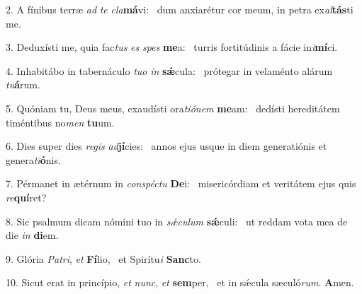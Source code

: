 2. A fínibus terræ \textit{ad} \textit{te} \textit{cla}\textbf{má}vi: \ast\  dum anxiarétur cor meum, in petra ex\textit{al}\textbf{tás}ti me.\

3. Deduxísti me, quia fac\textit{tus} \textit{es} \textit{spes} \textbf{me}a: \ast\  turris fortitúdinis a fácie in\textit{i}\textbf{mí}ci.\

4. Inhabitábo in tabernáculo \textit{tu}\textit{o} \textit{in} \textbf{sǽ}cula: \ast\  prótegar in velaménto alárum \textit{tu}\textbf{á}rum.\

5. Quóniam tu, Deus meus, exaudísti ora\textit{ti}\textit{ó}\textit{nem} \textbf{me}am: \ast\  dedísti hereditátem timéntibus no\textit{men} \textbf{tu}um.\

6. Dies super dies \textit{re}\textit{gis} \textit{ad}\textbf{jí}cies: \ast\  annos ejus usque in diem generatiónis et genera\textit{ti}\textbf{ó}nis.\

7. Pérmanet in ætérnum in \textit{con}\textit{spéc}\textit{tu} \textbf{De}i: \ast\  misericórdiam et veritátem ejus quis \textit{re}\textbf{quí}ret?\

8. Sic psalmum dicam nómini tuo in \textit{sǽ}\textit{cu}\textit{lum} \textbf{sǽ}culi: \ast\  ut reddam vota mea de die \textit{in} \textbf{di}em.\

9. Glória \textit{Pa}\textit{tri}, \textit{et} \textbf{Fí}lio, \ast\  et Spirítu\textit{i} \textbf{Sanc}to.\

10. Sicut erat in princípio, \textit{et} \textit{nunc}, \textit{et} \textbf{sem}per, \ast\  et in sǽcula sæculó\textit{rum}. \textbf{A}men.\

